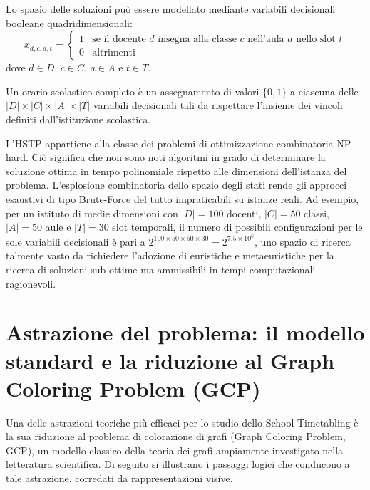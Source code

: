 Lo spazio delle soluzioni può essere modellato mediante variabili decisionali
booleane quadridimensionali:
\begin{equation}
x_{d,c,a,t} = \begin{cases} 
1 & \text{se il docente } d \text{ insegna alla classe } c \text{ nell'aula } a \text{ nello slot } t \\
0 & \text{altrimenti}
\end{cases}
\label{eq:variabili-decisionali}
\end{equation}
dove $d \in D$, $c \in C$, $a \in A$ e $t \in T$.

Un orario scolastico completo è un assegnamento di valori $\{0,1\}$ a ciascuna
delle $|D| \times |C| \times |A| \times |T|$ variabili decisionali tali da
rispettare l'insieme dei vincoli definiti dall'istituzione scolastica.

L'HSTP appartiene alla classe dei problemi di ottimizzazione combinatoria
NP-hard. Ciò significa che non sono noti algoritmi in grado di determinare la
soluzione ottima in tempo polinomiale rispetto alle dimensioni dell'istanza del
problema. L'esplosione combinatoria dello spazio degli stati rende gli approcci
esaustivi di tipo Brute-Force del tutto impraticabili su istanze reali. Ad
esempio, per un istituto di medie dimensioni con $|D|=100$ docenti, $|C|=50$
classi, $|A|=50$ aule e $|T|=30$ slot temporali, il numero di possibili
configurazioni per le sole variabili decisionali è pari a $2^{100 \times 50
\times 50 \times 30} = 2^{7.5 \times 10^6}$, uno spazio di ricerca talmente
vasto da richiedere l'adozione di euristiche e metaeuristiche per la ricerca di
soluzioni sub-ottime ma ammissibili in tempi computazionali ragionevoli.
\newpage
\section{Astrazione del problema: il modello standard e la riduzione al Graph Coloring Problem (GCP)}
\label{sec:astrazione-gcp}
Una delle astrazioni teoriche più efficaci per lo studio dello School
Timetabling è la sua riduzione al problema di colorazione di grafi (Graph
Coloring Problem, GCP), un modello classico della teoria dei grafi ampiamente
investigato nella letteratura scientifica. Di seguito si illustrano i passaggi
logici che conducono a tale astrazione, corredati da rappresentazioni visive.

